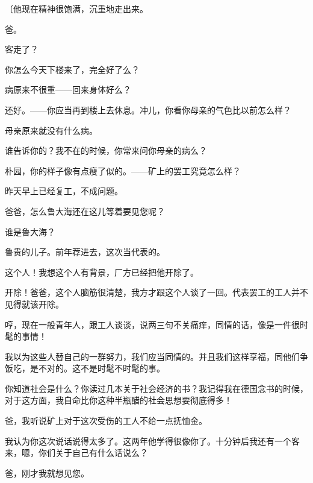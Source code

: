 {\fangsong〔他现在精神很饱满，沉重地走出来。}


\nobreak\quads[4]爸。


客走了？

你怎么今天下楼来了，完全好了么？

病原来不很重——回来身体好么？

还好。——你应当再到楼上去休息。冲儿，你看你母亲的气色比以前怎么样？

母亲原来就没有什么病。

谁告诉你的？我不在的时候，你常来问你母亲的病么？

朴园，你的样子像有点瘦了似的。——矿上的罢工究竟怎么样？

昨天早上已经复工，不成问题。

爸爸，怎么鲁大海还在这儿等着要见您呢？

谁是鲁大海？

鲁贵的儿子。前年荐进去，这次当代表的。

这个人！我想这个人有背景，厂方已经把他开除了。

开除！爸爸，这个人脑筋很清楚，我方才跟这个人谈了一回。代表罢工的工人并不见得就该开除。

哼，现在一般青年人，跟工人谈谈，说两三句不关痛痒，同情的话，像是一件很时髦的事情！

我以为这些人替自己的一群努力，我们应当同情的。并且我们这样享福，同他们争饭吃，是不对的。这不是时髦不时髦的事。

你知道社会是什么？你读过几本关于社会经济的书？我记得我在德国念书的时候，对于这方面，我自命比你这种半瓶醋的社会思想要彻底得多！

爸，我听说矿上对于这次受伤的工人不给一点抚恤金。

我认为你这次说话说得太多了。这两年他学得很像你了。十分钟后我还有一个客来，嗯，你们关于自己有什么话说么？

爸，刚才我就想见您。


